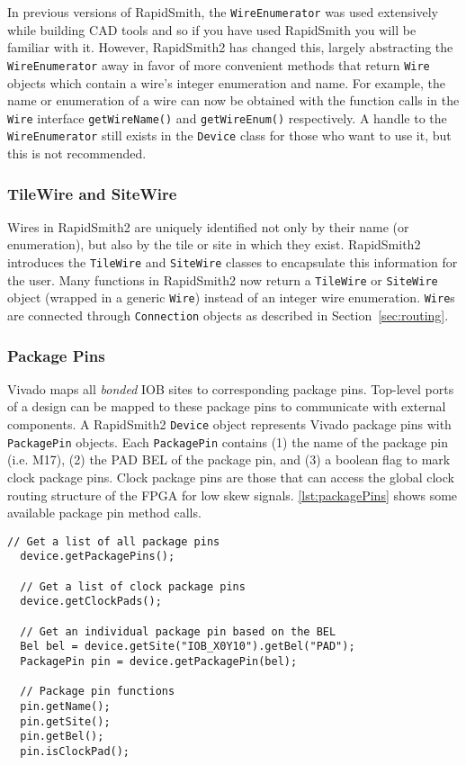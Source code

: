 In previous versions of RapidSmith, the \texttt{WireEnumerator} was used
extensively while building CAD tools and so if you have used RapidSmith you
will be familiar with it.
However, RapidSmith2 has changed this, largely abstracting the
\texttt{WireEnumerator} away in favor of more convenient methods that return \texttt{Wire} objects which contain a wire's integer
enumeration and name. For example, the name or enumeration of a wire can now be
obtained with the function calls in the \texttt{Wire} interface
\texttt{getWireName()} and \texttt{getWireEnum()} respectively. A handle to the
\texttt{WireEnumerator} still exists in the \texttt{Device} class for those who
want to use it, but this is not recommended.


\subsubsection{TileWire and SiteWire} \label{wires}
Wires in RapidSmith2 are uniquely identified not only by their name
(or enumeration), but also by the tile or site in which they exist.
RapidSmith2 introduces the \texttt{TileWire} and \texttt{SiteWire} classes to
encapsulate this information for the user. Many functions in RapidSmith2 now
return a \texttt{TileWire} or \texttt{SiteWire} object (wrapped in a generic
\texttt{Wire}) instead of an integer wire enumeration. \texttt{Wire}s are
connected through \texttt{Connection} objects as described in
Section~\ref{sec:routing}.

\subsubsection{Package Pins}

Vivado maps all \textit{bonded} IOB sites to corresponding package pins.
Top-level ports of a design can be mapped to these package pins to communicate
with external components. A RapidSmith2 \texttt{Device} object represents Vivado
package pins with \texttt{PackagePin} objects. Each \texttt{PackagePin} 
contains (1) the name of the package pin (i.e. M17), (2) the PAD BEL of the
package pin, and (3) a boolean flag to mark clock package pins. Clock
package pins are those that can access the global clock routing structure of
the FPGA for low skew signals. \autoref{lst:packagePins} shows some available
package pin method calls.

\begin{lstlisting}[xleftmargin=1.5em, framexleftmargin=1.5em,caption=RapidSmith2
package pin functions, label=lst:packagePins] 
  // Get a list of all package pins 
  device.getPackagePins();
	
  // Get a list of clock package pins
  device.getClockPads();
	
  // Get an individual package pin based on the BEL
  Bel bel = device.getSite("IOB_X0Y10").getBel("PAD");
  PackagePin pin = device.getPackagePin(bel);
	
  // Package pin functions
  pin.getName();
  pin.getSite();
  pin.getBel();
  pin.isClockPad();	
\end{lstlisting}

